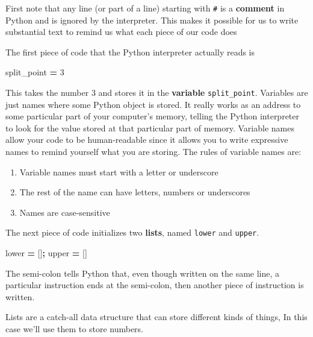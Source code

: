 \documentclass[
  letterpaper,
]{scrbook}
\newenvironment{Shaded}{\begin{snugshade}}{\end{snugshade}}
\newcommand{\DecValTok}[1]{\textcolor[rgb]{0.00,0.00,0.81}{#1}}
\newcommand{\NormalTok}[1]{#1}
\newcommand{\OperatorTok}[1]{\textcolor[rgb]{0.81,0.36,0.00}{\textbf{#1}}}
\providecommand{\tightlist}{%
  \setlength{\itemsep}{0pt}\setlength{\parskip}{0pt}}
\begin{document}
First note that any line (or part of a line) starting with \texttt{\#} is a \textbf{comment} in Python and is ignored by the interpreter. This makes it possible for us to write substantial text to remind us what each piece of our code does

The first piece of code that the Python interpreter actually reads is

\begin{Shaded}
\begin{Highlighting}[]
\NormalTok{split\_point }\OperatorTok{=} \DecValTok{3}
\end{Highlighting}
\end{Shaded}

This takes the number 3 and stores it in the \textbf{variable} \texttt{split\_point}. Variables are just names where some Python object is stored. It really works as an address to some particular part of your computer's memory, telling the Python interpreter to look for the value stored at that particular part of memory. Variable names allow your code to be human-readable since it allows you to write expressive names to remind yourself what you are storing. The rules of variable names are:

\begin{enumerate}
\def\labelenumi{\arabic{enumi}.}
\tightlist
\item
  Variable names must start with a letter or underscore
\item
  The rest of the name can have letters, numbers or underscores
\item
  Names are case-sensitive
\end{enumerate}

The next piece of code initializes two \textbf{lists}, named \texttt{lower} and \texttt{upper}.

\begin{Shaded}
\begin{Highlighting}[]
\NormalTok{lower }\OperatorTok{=}\NormalTok{ []}\OperatorTok{;}\NormalTok{ upper }\OperatorTok{=}\NormalTok{ []}
\end{Highlighting}
\end{Shaded}

The semi-colon tells Python that, even though written on the same line, a particular instruction ends at the semi-colon, then another piece of instruction is written.

Lists are a catch-all data structure that can store different kinds of things, In this case we'll use them to store numbers.
\end{document}
